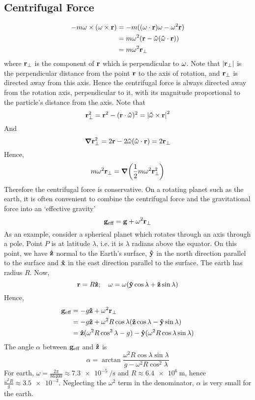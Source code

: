 \documentclass{article}
\begin{document}
\subsection{Centrifugal Force}
\begin{align*}
    -m\vb\omega \times (\vb\omega \times \vb r) & = -m((\vb\omega \cdot \vb r)\vb\omega - \vb\omega^2\vb r) \\
                                                & = m\omega^2(\vb r - \vu\omega(\vu\omega \cdot \vb r))     \\
                                                & = m\omega^2 \vb r_\perp
\end{align*}
where $\vb r_\perp$ is the component of $\vb r$ which is perpendicular to $\vb\omega$. Note that $\abs{\vb r_\perp}$ is the perpendicular distance from the point $\vb r$ to the axis of rotation, and $\vb r_\perp$ is directed away from this axis. Hence the centrifugal force is always directed away from the rotation axis, perpendicular to it, with its magnitude proportional to the particle's distance from the axis. Note that
\[ \vb r_\perp^2 = \vb r^2 - (\vb r \cdot \vu\omega)^2 = \abs{\vu\omega \times \vb r}^2 \]
And
\[ \grad \vb r_\perp^2 = 2\vb r - 2\vu\omega(\vu\omega \cdot \vb r) = 2\vb r_\perp \]
Hence,
\[ m\omega^2\vb r_\perp = \grad(\frac{1}{2}m\omega^2\vb r_\perp^2) \]
Therefore the centrifugal force is conservative. On a rotating planet such as the earth, it is often convenient to combine the centrifugal force and the gravitational force into an `effective gravity'
\[ \vb g_{\text{eff}} = \vb g + \omega^2 \vb r_\perp \]
As an example, consider a spherical planet which rotates through an axis through a pole. Point $P$ is at latitude $\lambda$, i.e. it is $\lambda$ radians above the equator. On this point, we have $\vu z$ normal to the Earth's surface, $\vu y$ in the north direction parallel to the surface and $\vu x$ in the east direction parallel to the surface. The earth has radius $R$. Now,
\[ \vb r = R\vu z;\quad \vb\omega = \omega(\vu y \cos\lambda + \vu z \sin\lambda) \]
Hence,
\begin{align*}
    \vb g_\text{eff} & = -g\vu z + \omega^2 \vb r_\perp                                              \\
                     & = -g\vu z + \omega^2 R\cos\lambda (\vu z \cos\lambda - \vu y \sin\lambda)     \\
                     & = \vu z(\omega^2 R\cos^2\lambda - g) - \vu y(\omega^2R\cos\lambda\sin\lambda)
\end{align*}
The angle $\alpha$ between $\vb g_\text{eff}$ and $\vu z$ is
\[ \alpha = \arctan \frac{\omega^2R\cos\lambda\sin\lambda}{g - \omega^2R\cos^2\lambda} \]
For earth, $\omega = \frac{2\pi}{86400} \approx \SI{7.3e-5}{\per\second}$ and $R \approx \SI{6.4e6}{\metre}$, hence $\frac{\omega^2R}{g} \approx \num{3.5e-3}$. Neglecting the $\omega^2$ term in the denominator, $\alpha$ is very small for the earth.
\end{document}
